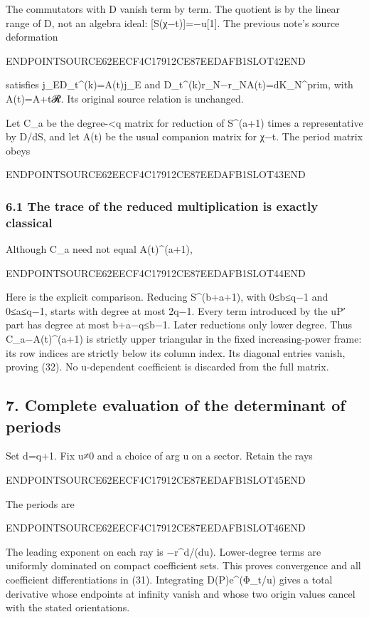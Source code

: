 The commutators with D vanish term by term. The quotient is by the linear range of D, not an algebra ideal: {[}S(χ−t){]}=−u{[}1{]}. The previous note's source deformation

ENDPOINTSOURCE62EECF4C17912CE87EEDAFB1SLOT42END

satisfies j\_ED\_t\^{}(k)=A(t)j\_E and D\_t\^{}(k)r\_N−r\_NA(t)=dK\_N\^{}prim, with A(t)=A+t𝓡. Its original source relation is unchanged.

Let C\_a be the degree-\textless q matrix for reduction of S\^{}(a+1) times a representative by D/dS, and let A(t) be the usual companion matrix for χ−t. The period matrix obeys

ENDPOINTSOURCE62EECF4C17912CE87EEDAFB1SLOT43END

\subsubsection{6.1 The trace of the reduced multiplication is exactly classical}\label{endpoint-sga_trace_period--the-trace-of-the-reduced-multiplication-is-exactly-classical}

Although C\_a need not equal A(t)\^{}(a+1),

ENDPOINTSOURCE62EECF4C17912CE87EEDAFB1SLOT44END

Here is the explicit comparison. Reducing S\^{}(b+a+1), with 0≤b≤q−1 and 0≤a≤q−1, starts with degree at most 2q−1. Every term introduced by the uP′ part has degree at most b+a−q≤b−1. Later reductions only lower degree. Thus C\_a−A(t)\^{}(a+1) is strictly upper triangular in the fixed increasing-power frame: its row indices are strictly below its column index. Its diagonal entries vanish, proving (32). No u-dependent coefficient is discarded from the full matrix.

\subsection{7. Complete evaluation of the determinant of periods}\label{endpoint-sga_trace_period--complete-evaluation-of-the-determinant-of-periods}

Set d=q+1. Fix u≠0 and a choice of arg u on a sector. Retain the rays

ENDPOINTSOURCE62EECF4C17912CE87EEDAFB1SLOT45END

The periods are

ENDPOINTSOURCE62EECF4C17912CE87EEDAFB1SLOT46END

The leading exponent on each ray is −r\^{}d/(d\textbar u\textbar). Lower-degree terms are uniformly dominated on compact coefficient sets. This proves convergence and all coefficient differentiations in (31). Integrating D(P)e\^{}(Φ\_t/u) gives a total derivative whose endpoints at infinity vanish and whose two origin values cancel with the stated orientations.

